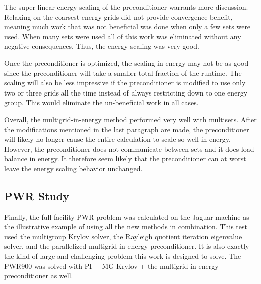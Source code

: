 The super-linear energy scaling of the preconditioner warrants more discussion. Relaxing on the coarsest energy grids did not provide convergence benefit, meaning much work that was not beneficial was done when only a few sets were used. When many sets were used all of this work was eliminated without any negative consequences. Thus, the energy scaling was very good.

Once the preconditioner is optimized, the scaling in energy may not be as good since the preconditioner will take a smaller total fraction of the runtime. The scaling will also be less impressive if the preconditioner is modified to use only two or three grids all the time instead of always restricting down to one energy group. This would eliminate the un-beneficial work in all cases. 

Overall, the multigrid-in-energy method performed very well with multisets. After the modifications mentioned in the last paragraph are made, the preconditioner will likely no longer cause the entire calculation to scale so well in energy. However, the preconditioner does not communicate between sets and it does load-balance in energy. It therefore seem likely that the preconditioner can at worst leave the energy scaling behavior unchanged. 

\subsection{PWR Study}
Finally, the full-facility PWR problem was calculated on the Jaguar machine as the illustrative example of using all the new methods in combination. This test used the multigroup Krylov solver, the Rayleigh quotient iteration eigenvalue solver, and the parallelized multigrid-in-energy preconditioner. It is also exactly the kind of large and challenging problem this work is designed to solve. The PWR900 was solved with PI + MG Krylov + the multigrid-in-energy preconditioner as well. 

